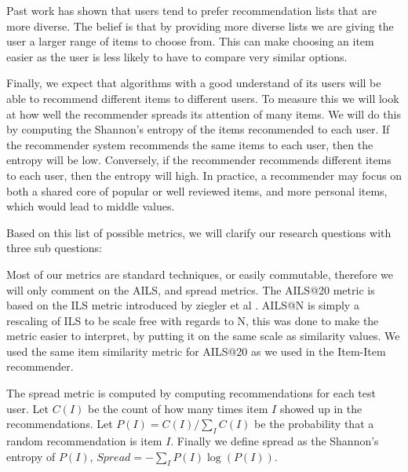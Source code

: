 \documentclass[letterpaper]{sig-alternate}
\begin{document}
  Past work \cite{zieglerDiversity, martijnDiversity} has shown that users tend to prefer recommendation lists that are more diverse.
  The belief is that by providing more diverse lists we are giving the user a larger range of items to choose from.
  This can make choosing an item easier as the user is less likely to have to compare very similar options.

  Finally, we expect that algorithms with a good understand of its users will be able to recommend different items to different users.
  To measure this we will look at how well the recommender spreads its attention of many items.
  We will do this by computing the Shannon's entropy of the items recommended to each user.
  If the recommender system recommends the same items to each user, then the entropy will be low.
  Conversely, if the recommender recommends different items to each user, then the entropy will high.
  In practice, a recommender may focus on both a shared core of popular or well reviewed items, and more personal items, which would lead to middle values.
  
  Based on this list of possible metrics, we will clarify our research questions with three sub questions:















  Most of our metrics are standard techniques, or easily commutable, therefore we will only comment on the AILS, and spread metrics.
  The AILS@20 metric is based on the ILS metric introduced by ziegler et al \cite{zieglerDiversity}.
  AILS@N is simply a rescaling of ILS to be scale free with regards to N, this was done to make the metric easier to interpret, by putting it on the same scale as similarity values.
  We used the same item similarity metric for AILS@20 as we used in the Item-Item recommender.
 
  The spread metric is computed by computing recommendations for each test user.
  Let $C(I)$ be the count of how many times item $I$ showed up in the recommendations.
  Let $P(I) = C(I) / \sum_I C(I)$ be the probability that a random recommendation is item $I$.
  Finally we define spread as the Shannon's entropy of $P(I)$, $Spread = -\sum_I P(I) \log(P(I))$.
\end{document}
